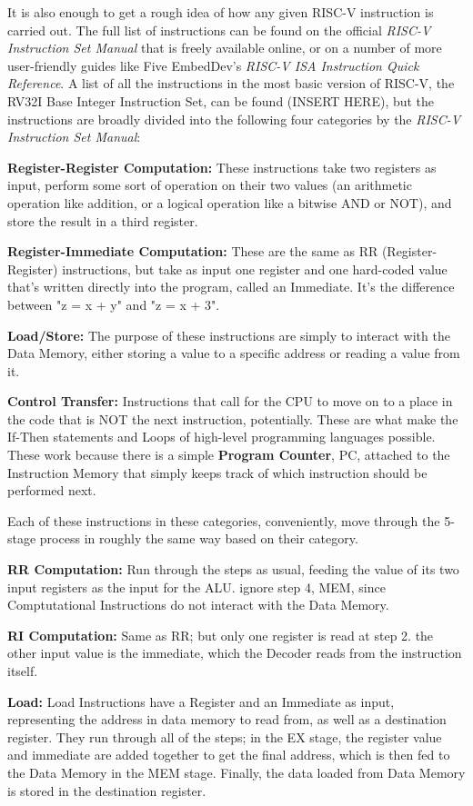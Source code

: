\documentclass[12pt,twoside]{reedthesis}
\begin{document}
It is also enough to get a rough idea of how any given RISC-V instruction is carried out. The full list of instructions can be found on the official \textit{RISC-V Instruction Set Manual} that is freely available online, or on a number of more user-friendly guides like Five EmbedDev's \textit{RISC-V ISA Instruction Quick Reference}. A list of all the instructions in the most basic version of RISC-V, the RV32I Base Integer Instruction Set, can be found (INSERT HERE), but the instructions are broadly divided into the following four categories by the \textit{RISC-V Instruction Set Manual}:


\textbf{Register-Register Computation:} These instructions take two registers as input, perform some sort of operation on their two values (an arithmetic operation like addition, or a logical operation like a bitwise AND or NOT), and store the result in a third register.

\textbf{Register-Immediate Computation:} These are the same as RR (Register-Register) instructions, but take as input one register and one hard-coded value that's written directly into the program, called an Immediate. It's the difference between "z = x + y" and "z = x + 3".

\textbf{Load/Store:} The purpose of these instructions are simply to interact with the Data Memory, either storing a value to a specific address or reading a value from it.

\textbf{Control Transfer:} Instructions that call for the CPU to move on to a place in the code that is NOT the next instruction, potentially. These are what make the If-Then statements and Loops of high-level programming languages possible. These work because there is a simple \textbf{Program Counter}, PC, attached to the Instruction Memory that simply keeps track of which instruction should be performed next.

Each of these instructions in these categories, conveniently, move through the 5-stage process in roughly the same way based on their category.

\textbf{RR Computation:} Run through the steps as usual, feeding the value of its two input registers as the input for the ALU. ignore step 4, MEM, since Comptutational Instructions do not interact with the Data Memory.

\textbf{RI Computation:} Same as RR; but only one register is read at step 2. the other input value is the immediate, which the Decoder reads from the instruction itself.

\textbf{Load:} Load Instructions have a Register and an Immediate as input, representing the address in data memory to read from, as well as a destination register. They run through all of the steps; in the EX stage, the register value and immediate are added together to get the final address, which is then fed to the Data Memory in the MEM stage. Finally, the data loaded from Data Memory is stored in the destination register.
\end{document}
